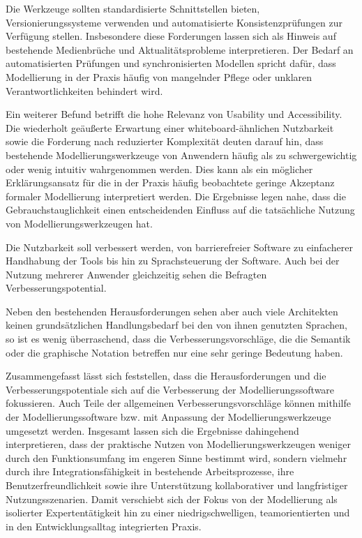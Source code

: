 Die Werkzeuge sollten standardisierte Schnittstellen bieten, Versionierungssysteme verwenden und automatisierte Konsistenzprüfungen zur Verfügung stellen. Insbesondere diese Forderungen lassen sich als Hinweis auf bestehende Medienbrüche und Aktualitätsprobleme interpretieren. Der Bedarf an automatisierten Prüfungen und synchronisierten Modellen spricht dafür, dass Modellierung in der Praxis häufig von mangelnder Pflege oder unklaren Verantwortlichkeiten behindert wird.

Ein weiterer Befund betrifft die hohe Relevanz von Usability und Accessibility. Die wiederholt geäußerte Erwartung einer whiteboard-ähnlichen Nutzbarkeit sowie die Forderung nach reduzierter Komplexität deuten darauf hin, dass bestehende Modellierungswerkzeuge von Anwendern häufig als zu schwergewichtig oder wenig intuitiv wahrgenommen werden. Dies kann als ein möglicher Erklärungsansatz für die in der Praxis häufig beobachtete geringe Akzeptanz formaler Modellierung interpretiert werden. Die Ergebnisse legen nahe, dass die Gebrauchstauglichkeit einen entscheidenden Einfluss auf die tatsächliche Nutzung von Modellierungswerkzeugen hat.

Die Nutzbarkeit soll verbessert werden, von barrierefreier Software zu einfacherer Handhabung der Tools bis hin zu Sprachsteuerung der Software. Auch bei der Nutzung mehrerer Anwender gleichzeitig sehen die Befragten Verbesserungspotential. 

Neben den bestehenden Herausforderungen sehen aber auch viele Architekten keinen grundsätzlichen Handlungsbedarf bei den von ihnen genutzten Sprachen, so ist es wenig überraschend, dass die Verbesserungsvorschläge, die die Semantik oder die graphische Notation betreffen nur eine sehr geringe Bedeutung haben.  

Zusammengefasst lässt sich feststellen, dass die Herausforderungen und die Verbesserungspotentiale sich auf die Verbesserung der Modellierungssoftware fokussieren. Auch Teile der allgemeinen Verbesserungsvorschläge können mithilfe der Modellierungssoftware bzw. mit Anpassung der Modellierungswerkzeuge umgesetzt werden. Insgesamt lassen sich die Ergebnisse dahingehend interpretieren, dass der praktische Nutzen von Modellierungswerkzeugen weniger durch den Funktionsumfang im engeren Sinne bestimmt wird, sondern vielmehr durch ihre Integrationsfähigkeit in bestehende Arbeitsprozesse, ihre Benutzerfreundlichkeit sowie ihre Unterstützung kollaborativer und langfristiger Nutzungsszenarien. Damit verschiebt sich der Fokus von der Modellierung als isolierter Expertentätigkeit hin zu einer niedrigschwelligen, teamorientierten und in den Entwicklungsalltag integrierten Praxis.


